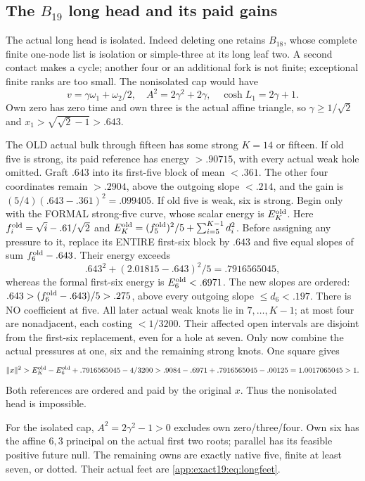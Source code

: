 \subsection{The \(B_{19}\) long head and its paid gains}
\label{app:exact19:Bhead}

The actual long head is isolated.
Indeed deleting one retains
\(B_{18}\), whose complete finite
one-node list is isolation or
simple-three at its long leaf two.
A second contact makes a cycle;
another four or an additional fork
is not finite; exceptional finite
ranks are too small.
The nonisolated cap would have
\[
 v=\gamma\omega_1+\omega_2/2,\quad
 A^2=2\gamma^2+2\gamma,\quad\cosh L_1=2\gamma+1 .
\]
Own zero has zero time and own
three is the actual affine
triangle, so \(\gamma\ge1/\sqrt2\)
and \(x_1>\sqrt{\sqrt2-1}>.643\).

The OLD actual bulk through fifteen
has some strong \(K=14\) or fifteen.
If old five is strong, its paid
reference has energy \(>.90715\),
with every actual weak hole omitted.
Graft
\(.643\) into its first-five block
of mean \(<.361\).
The other four coordinates remain
\(>.2904\), above the outgoing
slope \(<.214\), and the gain is
\((5/4)(.643-.361)^2=.099405\).
If old five is weak, six is strong.
Begin only with the FORMAL
strong-five curve, whose scalar
energy is \(E_K^{\rm old}\).
Here \(f_i^{\rm old}=\sqrt i-.61/\sqrt2\)
and \(E_K^{\rm old}=(f_5^{\rm old})^2/5
+\sum_{i=5}^{K-1}d_i^2\).
Before assigning any pressure to
it, replace its ENTIRE first-six
block by \(.643\) and five equal
slopes of sum \(f_6^{\rm old}-.643\).
Their energy exceeds
\[
 .643^2+(2.01815-.643)^2/5=.7916565045 ,
\]
whereas the formal first-six
energy is \(E_6^{\rm old}<.6971\).
The new slopes are ordered:
\(.643>(f_6^{\rm old}-.643)/5>.275\),
above every outgoing slope
\(\le d_6<.197\).
There is NO coefficient at five.
All later actual weak knots lie
in \(7,\ldots,K-1\); at most four
are nonadjacent, each costing
\(<1/3200\).
Their affected open intervals
are disjoint from the first-six
replacement, even for a hole
at seven.
Only now combine the actual
pressures at one, six and the
remaining strong knots.
One square gives
\[
 \|x\|^2>
 E_K^{\rm old}-E_6^{\rm old}
      +.7916565045-4/3200
 >.9084-.6971+.7916565045-.00125
       =1.0017065045>1 .
\]
Both references are ordered and
paid by the original \(x\).
Thus the nonisolated head is
impossible.

For the isolated cap,
\(A^2=2\gamma^2-1>0\) excludes
own zero/three/four.
Own six has the affine \(6,3\)
principal on the actual first two
roots; parallel has its feasible
positive future null.
The remaining owns are exactly
native five, finite at least seven,
or dotted.
Their actual feet are
\eqref{app:exact19:eq:longfeet}.

